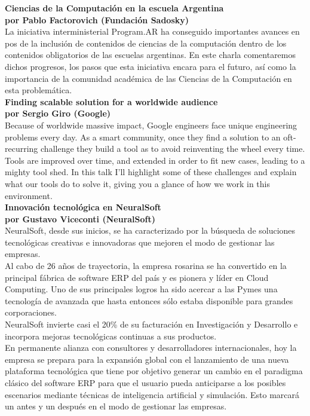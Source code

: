 \documentclass[12pt, a4paper]{article}
\newcommand{\charla}[3]{
	{\large\bf#1}\\
	{\bf por #2}\\
	#3\\
}
\begin{document}
\newpage

\charla
{Ciencias de la Computación en la escuela Argentina}
{Pablo Factorovich (Fundación Sadosky)}
{La iniciativa interministerial Program.AR ha conseguido importantes avances en pos de la inclusión de contenidos de ciencias de la computación dentro de los contenidos obligatorios de las escuelas argentinas. En este charla comentaremos dichos progresos, los pasos que esta iniciativa encara para el futuro, así como la importancia de la comunidad académica de las Ciencias de la Computación en esta problemática.}

\charla
{Finding scalable solution for a worldwide audience}
{Sergio Giro (Google)}
{Because of worldwide massive impact, Google engineers face unique engineering problems every day. As a smart community, once they find a solution to an oft-recurring challenge they build a tool as to avoid reinventing the wheel every time. Tools are improved over time, and extended in order to fit new cases, leading to a mighty tool shed. In this talk I'll highlight some of these challenges and explain what our tools do to solve it, giving you a glance of how we work in this environment.}

\charla
{Innovación tecnológica en NeuralSoft}
{Gustavo Viceconti (NeuralSoft)}
{NeuralSoft, desde sus inicios, se ha caracterizado por la búsqueda de soluciones tecnológicas creativas e innovadoras que mejoren el modo de gestionar las empresas. \\
Al cabo de 26 años de trayectoria, la empresa rosarina se ha convertido en la principal fábrica de software ERP del país y es pionera y líder en Cloud Computing. Uno de sus principales logros ha sido acercar a las Pymes una tecnología de avanzada que hasta entonces sólo estaba disponible para grandes corporaciones. \\
NeuralSoft invierte casi el 20\% de su facturación en Investigación y Desarrollo e incorpora mejoras tecnológicas continuas a sus productos. \\
En permanente alianza con consultores y desarrolladores internacionales, hoy la empresa se prepara para la expansión global con el lanzamiento de una nueva plataforma tecnológica que tiene por objetivo generar un cambio en el paradigma clásico del software ERP para que el usuario pueda anticiparse a los posibles escenarios mediante técnicas de inteligencia artificial y simulación. Esto marcará un antes y un después en el modo de gestionar las empresas.}
\end{document}
